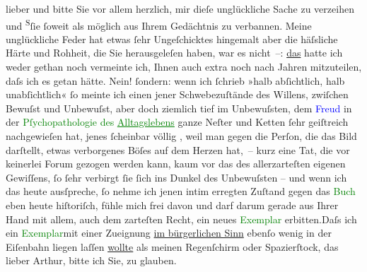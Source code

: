                lieber und bitte Sie vor allem herzlich, mir dieſe unglückliche Sache zu verzeihen
                  und{ }{\pb}\substVorne{}\textsuperscript{S}\substDazwischen{}ſ\substHinten{}ie ſoweit als möglich aus Ihrem Gedächtnis zu verbannen.\pend
           \pstart
           Meine unglückliche  Feder hat etwas ſehr
               Ungeſchicktes hingemalt aber die häſsliche Härte und Rohheit, die Sie herausgeleſen
               haben, war es nicht –: \uline{das} hatte ich weder gethan
               noch vermeinte ich, Ihnen auch extra noch nach {\pb}Jahren mitzuteilen, daſs ich es
               getan hätte. Nein! ſondern: wenn ich ſchrieb »halb abſichtlich, halb unabſichtlich«
               ſo meinte ich einen jener Schwebezuſtände des Willens, zwiſchen Bewuſst und
               Unbewuſst, aber doch ziemlich tief im Unbewuſsten, dem \textcolor{blue}{Freud}{}\ledrightnote{\textcolor{blue}{Sigmund Freud}} in der \textcolor{green}{Pſychopathologie des \uline{Alltagslebens}}{}\ledrightnote{\textcolor{green}{Zur Psychopathologie des Alltagslebens}} ganze Neſter und {\pb}Ketten
               ſehr geiſtreich nachgewieſen hat, jenes ſcheinbar völlig \label{K_L01978_1v}\label{K_L01978_1h}, weil man
               gegen die Perſon, die das Bild darſtellt, etwas verborgenes Böſes auf dem Herzen
               hat, – kurz eine Tat, die vor keinerlei Forum gezogen werden kann, kaum vor das des
               allerzarteſten eigenen Gewiſſens, ſo ſehr verbirgt ſie{ }{\pb}ſich ins Dunkel des Unbewuſsten –
               und wenn ich das heute ausſpreche, ſo nehme ich jenen intim erregten Zuſtand gegen
               das \textcolor{green}{Buch}{} eben heute hiſtoriſch,
               fühle mich frei davon und darf darum gerade aus Ihrer Hand mit allem, auch dem
               zarteſten Recht, ein neues \textcolor{green}{Exemplar}{} erbitten.\hspace*{1.5em}Daſs ich ein \textcolor{green}{Exemplar}{}mit einer Zueignung \uline{im bürgerlichen Sinn} ebenſo wenig in der Eiſenbahn liegen
               laſſen \uline{wollte} als meinen Regenſchirm oder
               Spazierſtock, das lieber Arthur, bitte ich Sie, zu glauben.\pend
